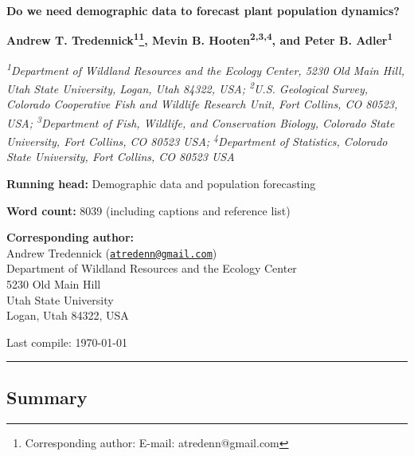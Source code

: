 \documentclass[12pt,]{article}
\title{}
\author{}
\date{}
\let\rmarkdownfootnote\footnote%
\def\footnote{\protect\rmarkdownfootnote}
\begin{document}
\maketitle


\textsf{\LARGE{\textbf{Do we need demographic data to forecast plant population dynamics?}}}

\renewcommand*{\thefootnote}{\fnsymbol{footnote}}

\vspace{1em}

\textsf{\normalsize{\textbf{Andrew T. Tredennick\textsuperscript{1}\footnote{Corresponding author: E-mail: atredenn@gmail.com}, Mevin B. Hooten\textsuperscript{2,3,4}, and Peter B. Adler\textsuperscript{1}}}}

\vspace{1em}

\textsf{\textit{\footnotesize{\textsuperscript{1}Department of Wildland Resources and the Ecology Center, 5230 Old Main Hill, Utah State University, Logan, Utah 84322, USA; \textsuperscript{2}U.S. Geological Survey, Colorado Cooperative Fish and Wildlife Research Unit, Fort Collins, CO 80523, USA; \textsuperscript{3}Department of Fish, Wildlife, and Conservation Biology, Colorado State University, Fort Collins, CO 80523 USA}; \textsuperscript{4}Department of Statistics, Colorado State University, Fort Collins, CO 80523 USA}}

\textbf{Running head:} Demographic data and population forecasting

\textbf{Word count:} 8039 (including captions and reference list)

\textbf{Corresponding author:}\\Andrew Tredennick
(\href{mailto:atredenn@gmail.com}{\nolinkurl{atredenn@gmail.com}})\\Department
of Wildland Resources and the Ecology Center\\5230 Old Main Hill\\Utah
State University\\Logan, Utah 84322, USA

Last compile: \today

\allsectionsfont{\normalfont\sffamily\bfseries}
\renewcommand*{\thefootnote}{\arabic{footnote}} \setcounter{footnote}{0}

\rule{\textwidth}{1pt}

\subsection{Summary}\label{summary}
\end{document}
